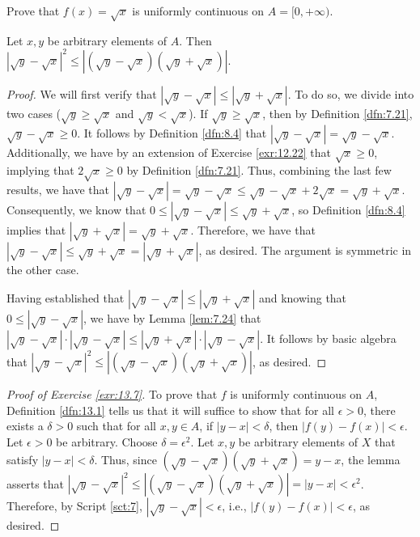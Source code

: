 \documentclass[../main.tex]{subfiles}
\begin{document}
\begin{exercise}\label{exr:13.7}
    Prove that $f(x)=\sqrt{x}$ is uniformly continuous on $A=[0,+\infty)$.
    \begin{lemma*}
        Let $x,y$ be arbitrary elements of $A$. Then $|\sqrt{y}-\sqrt{x}|^2\leq|(\sqrt{y}-\sqrt{x})(\sqrt{y}+\sqrt{x})|$.
        \begin{proof}
            We will first verify that $|\sqrt{y}-\sqrt{x}|\leq|\sqrt{y}+\sqrt{x}|$. To do so, we divide into two cases ($\sqrt{y}\geq\sqrt{x}$ and $\sqrt{y}<\sqrt{x}$). If $\sqrt{y}\geq\sqrt{x}$, then by Definition \ref{dfn:7.21}, $\sqrt{y}-\sqrt{x}\geq 0$. It follows by Definition \ref{dfn:8.4} that $|\sqrt{y}-\sqrt{x}|=\sqrt{y}-\sqrt{x}$. Additionally, we have by an extension of Exercise \ref{exr:12.22} that $\sqrt{x}\geq 0$, implying that $2\sqrt{x}\geq 0$ by Definition \ref{dfn:7.21}. Thus, combining the last few results, we have that $|\sqrt{y}-\sqrt{x}|=\sqrt{y}-\sqrt{x}\leq\sqrt{y}-\sqrt{x}+2\sqrt{x}=\sqrt{y}+\sqrt{x}$. Consequently, we know that $0\leq|\sqrt{y}-\sqrt{x}|\leq\sqrt{y}+\sqrt{x}$, so Definition \ref{dfn:8.4} implies that $|\sqrt{y}+\sqrt{x}|=\sqrt{y}+\sqrt{x}$. Therefore, we have that $|\sqrt{y}-\sqrt{x}|\leq\sqrt{y}+\sqrt{x}=|\sqrt{y}+\sqrt{x}|$, as desired. The argument is symmetric in the other case.\par
            Having established that $|\sqrt{y}-\sqrt{x}|\leq|\sqrt{y}+\sqrt{x}|$ and knowing that $0\leq|\sqrt{y}-\sqrt{x}|$, we have by Lemma \ref{lem:7.24} that $|\sqrt{y}-\sqrt{x}|\cdot|\sqrt{y}-\sqrt{x}|\leq|\sqrt{y}+\sqrt{x}|\cdot|\sqrt{y}-\sqrt{x}|$. It follows by basic algebra that $|\sqrt{y}-\sqrt{x}|^2\leq|(\sqrt{y}-\sqrt{x})(\sqrt{y}+\sqrt{x})|$, as desired.
        \end{proof}
    \end{lemma*}
    \begin{proof}[Proof of Exercise \ref{exr:13.7}]
        To prove that $f$ is uniformly continuous on $A$, Definition \ref{dfn:13.1} tells us that it will suffice to show that for all $\epsilon>0$, there exists a $\delta>0$ such that for all $x,y\in A$, if $|y-x|<\delta$, then $|f(y)-f(x)|<\epsilon$. Let $\epsilon>0$ be arbitrary. Choose $\delta=\epsilon^2$. Let $x,y$ be arbitrary elements of $X$ that satisfy $|y-x|<\delta$. Thus, since $(\sqrt{y}-\sqrt{x})(\sqrt{y}+\sqrt{x})=y-x$, the lemma asserts that $|\sqrt{y}-\sqrt{x}|^2\leq|(\sqrt{y}-\sqrt{x})(\sqrt{y}+\sqrt{x})|=|y-x|<\epsilon^2$. Therefore, by Script \ref{sct:7}, $|\sqrt{y}-\sqrt{x}|<\epsilon$, i.e., $|f(y)-f(x)|<\epsilon$, as desired.
    \end{proof}
\end{exercise}
\end{document}
